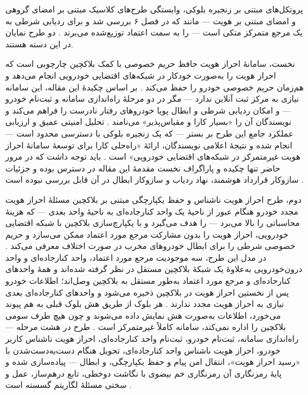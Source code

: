 پروتکل‌های مبتنی بر زنجیره بلوکی، وابستگی طرح‌های کلاسیک مبتنی بر امضای گروهی و امضای مبتنی بر هویت — مانند  که در فصل ۶ بررسی شد و برای ردیابی شرطی به یک مرجع متمرکز متکی است — را به سمت اعتماد توزیع‌شده می‌برند \cite{linGSISSecurePrivacyPreserving2007}. دو طرح نمایان در این دسته هستند.

نخست، سامانهٔ احراز هویت حافظ حریم خصوصی با کمک بلاکچین  چارچوبی است که احراز هویت را به‌صورت خودکار در شبکه‌های اقتضایی خودرویی انجام می‌دهد و هم‌زمان حریم خصوصی خودرو را حفظ می‌کند \cite{fengBPASBlockchainAssistedPrivacyPreserving2020}. بر اساس چکیدهٔ این مقاله، این سامانه نیازی به مرکز ثبت آنلاین ندارد — مگر در دو مرحلهٔ راه‌اندازی سامانه و ثبت‌نام خودرو — و امکان ردیابی شرطی و ابطال پویا خودروهای رفتار نادرست را فراهم می‌کند و نویسندگان آن را «بسیار کارا و مقیاس‌پذیر» می‌نامند \cite{fengBPASBlockchainAssistedPrivacyPreserving2020}. تحلیل امنیتی عمیق و ارزیابی عملکرد جامع این طرح بر بستر  — که یک زنجیره بلوکی با دسترسی محدود است — انجام شده و نتیجهٔ اعلامی نویسندگان، ارائهٔ «راه‌حلی کارا برای توسعهٔ سامانهٔ احراز هویت غیرمتمرکز در شبکه‌های اقتضایی خودرویی» است \cite{fengBPASBlockchainAssistedPrivacyPreserving2020}. باید توجه داشت که در مرور حاضر تنها چکیده و پاراگراف نخست مقدمهٔ این مقاله در دسترس بوده و جزئیات سازوکار قرارداد هوشمند، نهاد ردیاب و سازوکار ابطال در آن قابل بررسی نبوده است \cite{fengBPASBlockchainAssistedPrivacyPreserving2020}.

دوم، طرح احراز هویت ناشناس و حفظ یکپارچگی مبتنی بر بلاکچین  مسئلهٔ احراز هویت مجدد خودرو هنگام عبور از ناحیهٔ یک واحد کنارجاده‌ای به ناحیهٔ واحد بعدی — که هزینهٔ محاسباتی را بالا می‌برد — را هدف می‌گیرد و با یکپارچ‌سازی بلاکچین با شبکه اقتضایی خودرویی، احراز هویت را بدون مشارکت مرجع مورد اعتماد ممکن می‌سازد و حریم خصوصی شرطی را برای ابطال خودروهای مخرب در صورت اختلاف معرفی می‌کند \cite{mariaBAIVEfficientBlockchainBased2022}. در مدل این طرح، سه موجودیت مرجع مورد اعتماد، واحد کنارجاده‌ای و واحد درون‌خودرویی به‌علاوهٔ یک شبکهٔ بلاکچین مستقل در نظر گرفته شده‌اند و همهٔ واحدهای کنارجاده‌ای و مرجع مورد اعتماد به‌طور مستقل به بلاکچین وصل‌اند؛ اطلاعات خودرو پس از نخستین احراز هویت در بلاکچین ذخیره می‌شود و واحدهای کنارجاده‌ای بعدی نیازی به احراز هویت مجدد ندارند \cite{mariaBAIVEfficientBlockchainBased2022}. هر بلوک از طریق هش بلوک قبلی به هم پیوند می‌خورد، اطلاعات به‌صورت هش  نمایش داده می‌شوند و چون هیچ طرف سومی بلاکچین را اداره نمی‌کند، سامانه کاملاً غیرمتمرکز است \cite{mariaBAIVEfficientBlockchainBased2022}. طرح در هشت مرحله — راه‌اندازی سامانه، ثبت‌نام خودرو، ثبت‌نام واحد کنارجاده‌ای، احراز هویت ناشناس کاربر خودرو، احراز هویت ناشناس واحد کنارجاده‌ای، تحویل هنگام دست‌به‌دست‌شدن با «رسید احراز هویت»، انتقال امن پیام و حفظ یکپارچگی، و ابطال — پیاده‌سازی شده و پایهٔ رمزنگاری آن رمزنگاری خم بیضوی با نگاشت دوخطی، تابع درهم‌ساز، عمل  و سختی مسئلهٔ لگاریتم گسسته است \cite{mariaBAIVEfficientBlockchainBased2022}.

